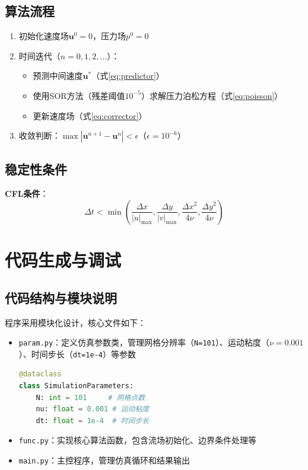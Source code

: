 \documentclass[UTF8]{ctexart}
\begin{document}
\subsection{算法流程}
\begin{enumerate}
    \item 初始化速度场$\mathbf{u}^0 = 0$，压力场$p^0 = 0$
    \item 时间迭代（$n = 0,1,2,\dots$）：
    \begin{itemize}
        \item 预测中间速度$\mathbf{u}^*$（式\ref{eq:predictor}）
        \item 使用SOR方法（残差阈值$10^{-5}$）求解压力泊松方程（式\ref{eq:poisson}）
        \item 更新速度场（式\ref{eq:corrector}）
    \end{itemize}
    \item 收敛判断：$\max|\mathbf{u}^{n+1} - \mathbf{u}^n| < \epsilon$（$\epsilon = 10^{-6}$）
\end{enumerate}

\subsection{稳定性条件}
\textbf{CFL条件}：
    \begin{equation}
    \Delta t < \min\left( \frac{\Delta x}{|u|_{\max}}, \frac{\Delta y}{|v|_{\max}}, \frac{\Delta x^2}{4\nu}, \frac{\Delta y^2}{4\nu} \right)
    \label{eq:cfl}
    \end{equation}


\newpage
\section{代码生成与调试}

\subsection{代码结构与模块说明}
程序采用模块化设计，核心文件如下：

\begin{itemize}
    \item \texttt{param.py}：定义仿真参数类，管理网格分辨率（\texttt{N=101}）、运动粘度（$\nu=0.001$）、时间步长（\texttt{dt=1e-4}）等参数
    \begin{lstlisting}[language=Python]
@dataclass
class SimulationParameters:
    N: int = 101     # 网格点数
    nu: float = 0.001 # 运动粘度
    dt: float = 1e-4  # 时间步长
    \end{lstlisting}

    \item \texttt{func.py}：实现核心算法函数，包含流场初始化、边界条件处理等
    \item \texttt{main.py}：主控程序，管理仿真循环和结果输出
\end{itemize}
\end{document}

